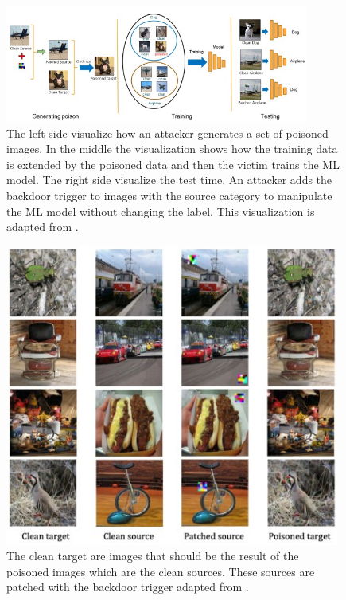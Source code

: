 \begin{figure}[ht!]
  \centering
  \includegraphics[width=10cm]{pictures/procedure_hidden_trigger.jpg}
  \caption{The left side visualize how an attacker generates a set of poisoned images. In the middle the visualization shows how the training data is extended by the poisoned data and then the victim trains the ML model. The right side visualize the test time. An attacker adds the backdoor trigger to images with the source category to manipulate the ML model without changing the label. This visualization is adapted from \cite{DBLP:journals/corr/abs-1910-00033}.}
  \label{fig:procedure_hidden_trigger}
\end{figure}

\begin{figure}[ht!]
  \centering
  \includegraphics[width=11cm]{pictures/poisoned_hidden_trigger.jpg}
  \caption{The clean target are images that should be the result of the poisoned images which are the clean sources. These sources are patched with the backdoor trigger adapted from \cite{DBLP:journals/corr/abs-1910-00033}.}
  \label{fig:poisoned_hidden_trigger}
\end{figure}

